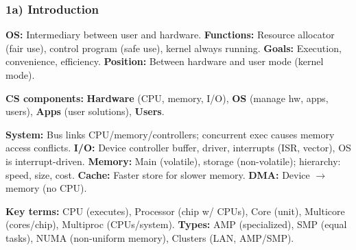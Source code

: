 


\subsubsection*{1a) Introduction}

\textbf{OS:} Intermediary between user and hardware. \textbf{Functions:} Resource allocator (fair use), control program (safe use), kernel always running. \textbf{Goals:} Execution, convenience, efficiency. \textbf{Position:} Between hardware and user mode (kernel mode).

\textbf{CS components:} \textbf{Hardware} (CPU, memory, I/O), \textbf{OS} (manage hw, apps, users), \textbf{Apps} (user solutions), \textbf{Users}.

\textbf{System:} Bus links CPU/memory/controllers; concurrent exec causes memory access conflicts. \textbf{I/O:} Device controller buffer, driver, interrupts (ISR, vector), OS is interrupt-driven. \textbf{Memory:} Main (volatile), storage (non-volatile); hierarchy: speed, size, cost. \textbf{Cache:} Faster store for slower memory. \textbf{DMA:} Device $\rightarrow$ memory (no CPU).

\textbf{Key terms:} CPU (executes), Processor (chip w/ CPUs), Core (unit), Multicore (cores/chip), Multiproc (CPUs/system). \textbf{Types:} AMP (specialized), SMP (equal tasks), NUMA (non-uniform memory), Clusters (LAN, AMP/SMP). 

